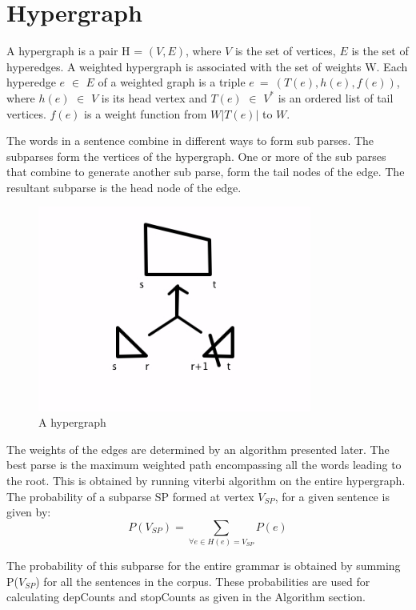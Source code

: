 \documentclass{book}
\begin{document}
\section{Hypergraph}

A hypergraph is a pair H = $(V, E)$, where $V$ is the set of vertices, $E$ is the set of hyperedges. A weighted hypergraph is associated with the set of weights W. Each hyperedge $e$ $\in$ $E$ of a weighted graph is a triple $e~=~(T(e), h(e), f(e))$, where $h(e)$ $\in$ $V$ is its head vertex and $T(e)$ $\in$ $V^*$ is an ordered list of tail vertices. $f(e)$ is a weight function from $W|T(e)|$ to $W$.

The words in a sentence combine in different ways to form sub parses. The subparses form the vertices of the hypergraph. One or more of the sub parses that combine to generate another sub parse, form the tail nodes of the edge. The resultant subparse is the head node of the edge. 

\begin{figure}
\centering
\includegraphics[width=90mm]{images/hypergraph_example.jpg}
\caption{A hypergraph}
\label{overflow}
\end{figure}


The weights of the edges are determined by an algorithm presented later. The best parse is the maximum weighted path encompassing all the words leading to the root. This is obtained by running viterbi algorithm on the entire hypergraph.
  The probability of a subparse SP formed at vertex $V_{SP}$, for a given sentence is given by:
            $$ P(V_{SP}) = \sum_{\forall e \in H(e) = V_{SP}} P(e) $$

The probability of this subparse for the entire grammar is obtained by summing P($V_{SP}$) for all the sentences in the corpus. These probabilities are used for calculating depCounts and stopCounts as given in the Algorithm section.
\end{document}
